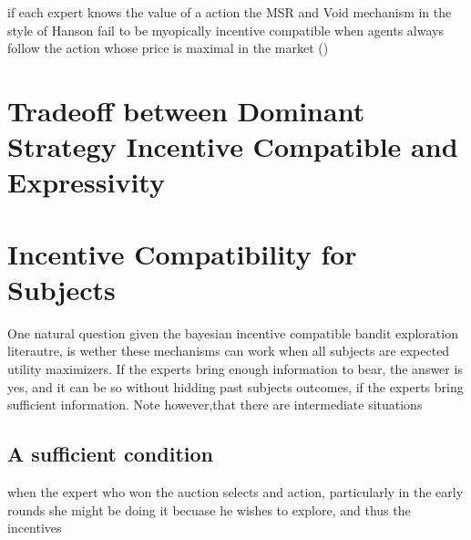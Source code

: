 if each expert knows the value of a action the MSR and Void mechanism in the style of Hanson fail to be myopically incentive compatible when agents always follow the action whose price is maximal in the market (\cite{othman2010decision})



\section{Tradeoff between Dominant Strategy Incentive Compatible and Expressivity}



\section{Incentive Compatibility for Subjects}

One natural question given the bayesian incentive compatible bandit exploration literautre, is wether these mechanisms can work when all subjects are expected utility maximizers. If the experts bring enough information to bear, the answer is yes, and it can be so without hidding past subjects outcomes, if the experts bring sufficient information. Note however,that there are intermediate situations 

\subsection{A sufficient condition}

when the expert who won the auction selects and action, particularly in the early rounds she might be doing it becuase he wishes to explore, and thus the incentives 


